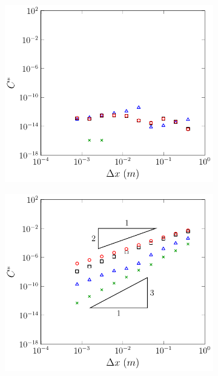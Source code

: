 \begin{figure}
	\centering
	\begin{subfigure}{0.5\textwidth}
		\includegraphics[width=\textwidth]{./chp5/figures/Analytic/LakeAtRest/C1/Num/FEVM2WB.pdf}
		\vspace{0.5cm}
	\end{subfigure}%
	\begin{subfigure}{0.5\textwidth}
		\includegraphics[width=\textwidth]{./chp5/figures/Analytic/LakeAtRest/C1/Num/FEVM2nWB.pdf}

\end{subfigure}
\end{figure}
